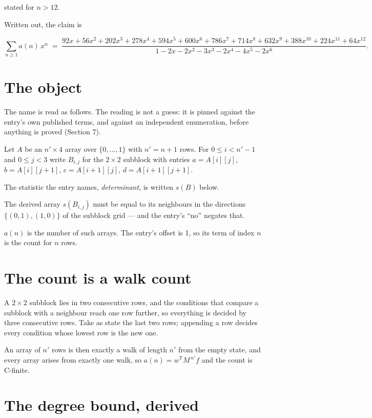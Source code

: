 \documentclass[11pt]{article}
\theoremstyle{definition}
\begin{document}
stated for $n > 12$.

Written out, the claim is

\[\sum_{n \ge 1} a(n)\,x^n \;=\; \frac{92x + 56x^{2} + 202x^{3} + 278x^{4} + 594x^{5} + 600x^{6} + 786x^{7} + 714x^{8} + 632x^{9} + 388x^{10} + 224x^{11} + 64x^{12}}{1 - 2x - 2x^{2} - 3x^{3} - 2x^{4} - 4x^{5} - 2x^{6}}.\]

\section{The object}

The name is read as follows. The reading is not a guess: it is pinned against the entry's own published terms, and against an independent enumeration, before anything is proved (Section 7).

Let $A$ be an $n' \times 4$ array over $\{0,\dots,1\}$ with $n' = n + 1$ rows. For $0 \le i < n'-1$ and $0 \le j < 3$ write $B_{i,j}$ for the $2\times2$ subblock with entries $a = A[i][j]$, $b = A[i][j{+}1]$, $c = A[i{+}1][j]$, $d = A[i{+}1][j{+}1]$.

The statistic the entry names, {\itshape determinant}, is written $s(B)$ below.

The derived array $s(B_{i,j})$ must be equal to its neighbours in the directions $\{(0,1), (1,0)\}$ of the subblock grid --- and the entry's ``no'' negates that.

$a(n)$ is the number of such arrays. The entry's offset is 1, so its term of index $n$ is the count for $n$ rows.

\section{The count is a walk count}

A $2\times2$ subblock lies in two consecutive rows, and the conditions that compare a subblock with a neighbour reach one row further, so everything is decided by three consecutive rows. Take as state the last two rows; appending a row decides every condition whose lowest row is the new one.

An array of $n'$ rows is then exactly a walk of length $n'$ from the empty state, and every array arises from exactly one walk, so $a(n) = w^{\mathsf T}M^{\,n'}f$ and the count is C-finite.

\section{The degree bound, derived}
\end{document}
